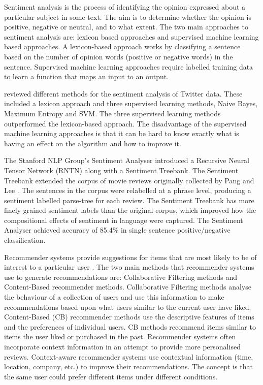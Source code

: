 Sentiment analysis is the process of identifying the opinion expressed about a particular subject in some text. The aim is to determine whether the opinion is positive, negative or neutral, and to what extent. The two main approaches to sentiment analysis are: lexicon based approaches and supervised machine learning based approaches. A lexicon-based approach works by classifying a sentence based on the number of opinion words (positive or negative words) in the sentence. Supervised machine learning approaches require labelled training data to learn a function that maps an input to an output.

\cite{Bhuta2014} reviewed different methods for the sentiment analysis of Twitter data. These included a lexicon approach and three supervised learning methods, Naive Bayes, Maximum Entropy and SVM. The three supervised learning methods outperformed the lexicon-based approach. The disadvantage of the supervised machine learning approaches is that it can be hard to know exactly what is having an effect on the algorithm and how to improve it.

The Stanford NLP Group's Sentiment Analyser \cite{stanfordSentiment2013} introduced a Recursive Neural Tensor Network (RNTN) along with a Sentiment Treebank. The Sentiment Treebank extended the corpus of movie reviews originally collected by Pang and Lee \cite{panglee2004}. The sentences in the corpus were relabelled at a phrase level, producing a sentiment labelled parse-tree for each review. The Sentiment Treebank has more finely grained sentiment labels than the original corpus, which improved how the compositional effects of sentiment in language were captured. The Sentiment Analyser achieved accuracy of 85.4\% in single sentence positive/negative classification.

Recommender systems provide suggestions for items that are most likely to be of interest to a particular user \cite{Ricci2015}. The two main methods that recommender systems use to generate recommendations are: Collaborative Filtering methods and Content-Based recommender methods. Collaborative Filtering methods analyse the behaviour of a collection of users and use this information to make recommendations based upon what users similar to the current user have liked. Content-Based (CB) recommender methods use the descriptive features of items and the preferences of individual users. CB methods recommend items similar to items the user liked or purchased in the past. Recommender systems often incorporate context information in an attempt to provide more personalised reviews. Context-aware recommender systems use contextual information (time, location, company, etc.) to improve their recommendations. The concept is that the same user could prefer different items under different conditions.

